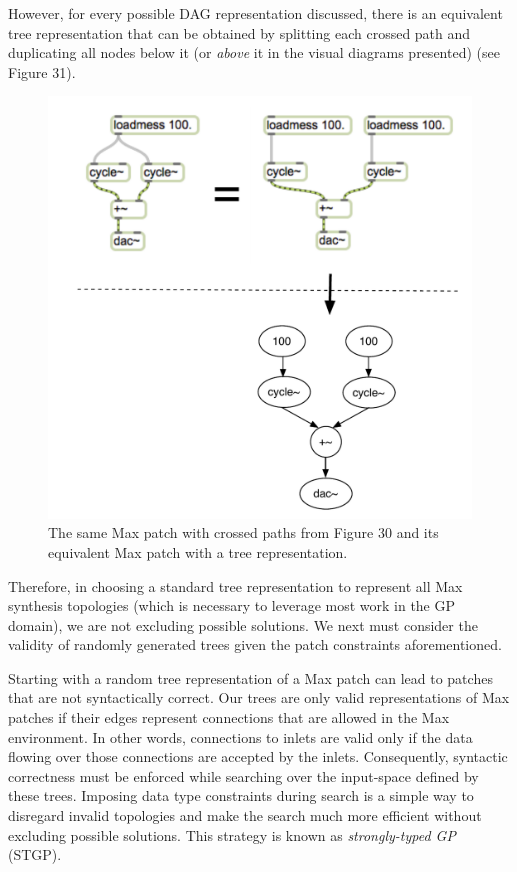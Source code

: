 \documentclass[12pt]{report} 	%
\numberwithin{figure}{chapter}
\numberwithin{table}{chapter}
\numberwithin{equation}{chapter}
\begin{document}
\begin{flushleft}
However, for every possible DAG representation discussed, there is an equivalent tree representation that can be obtained by splitting each crossed path and duplicating all nodes below it (or \textit{above} it in the visual diagrams presented) (see Figure 31).
\begin{figure}[h!]
\begin{center}
\includegraphics[scale=0.8]{MaxDAGsCrossedPaths2}
\caption[Uncrossing paths to form a tree]{The same Max patch with crossed paths from Figure 30 and its equivalent Max patch with a tree representation.}
\end{center}
\vspace{9pt}
\end{figure}

Therefore, in choosing a standard tree representation to represent all Max synthesis topologies (which is necessary to leverage most work in the GP domain), we are not excluding possible solutions. We next must consider the validity of randomly generated trees given the patch constraints aforementioned.

Starting with a random tree representation of a Max patch can lead to patches that are not syntactically correct. Our trees are only valid representations of Max patches if their edges represent connections that are allowed in the Max environment. In other words, connections to inlets are valid only if the data flowing over those connections are accepted by the inlets. Consequently, syntactic correctness must be enforced while searching over the input-space defined by these trees. Imposing data type constraints during search is a simple way to disregard invalid topologies and make the search much more efficient without excluding possible solutions. This strategy is known as \textit{strongly-typed GP} (STGP). 


\end{flushleft}
\end{document}
